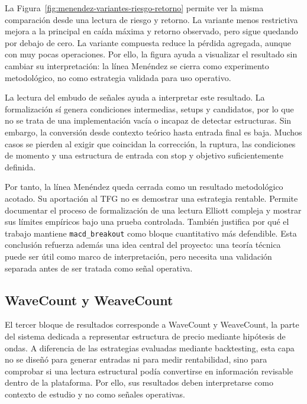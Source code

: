 La Figura~\ref{fig:menendez-variantes-riesgo-retorno} permite ver la misma
comparaci\'on desde una lectura de riesgo y retorno. La variante menos
restrictiva mejora a la principal en ca\'ida m\'axima y retorno observado, pero
sigue quedando por debajo de cero. La variante compuesta reduce la p\'erdida
agregada, aunque con muy pocas operaciones. Por ello, la figura ayuda a
visualizar el resultado sin cambiar su interpretaci\'on: la l\'inea Men\'endez se
cierra como experimento metodol\'ogico, no como estrategia validada para uso
operativo.

La lectura del embudo de se\~nales ayuda a interpretar este resultado. La
formalizaci\'on s\'i genera condiciones intermedias, setups y candidatos, por lo
que no se trata de una implementaci\'on vac\'ia o incapaz de detectar
estructuras. Sin embargo, la conversi\'on desde contexto te\'orico hasta entrada
final es baja. Muchos casos se pierden al exigir que coincidan la correcci\'on,
la ruptura, las condiciones de momento y una estructura de entrada con stop y
objetivo suficientemente definida.

Por tanto, la l\'inea Men\'endez queda cerrada como un resultado metodol\'ogico
acotado. Su aportaci\'on al TFG no es demostrar una estrategia rentable. Permite
documentar el proceso de formalizaci\'on de una lectura Elliott compleja y
mostrar sus l\'imites emp\'iricos bajo una prueba controlada. Tambi\'en justifica
por qu\'e el trabajo mantiene \texttt{macd\_breakout} como bloque cuantitativo m\'as
defendible. Esta conclusi\'on refuerza adem\'as una idea central del proyecto:
una teor\'ia t\'ecnica puede ser \'util como marco de interpretaci\'on, pero
necesita una validaci\'on separada antes de ser tratada como se\~nal operativa.

\subsection{WaveCount y WeaveCount}
\label{subsec:resultados-wavecount-weavecount}

El tercer bloque de resultados corresponde a WaveCount y WeaveCount, la parte
del sistema dedicada a representar estructura de precio mediante hip\'otesis de
ondas. A diferencia de las estrategias evaluadas mediante backtesting, esta capa
no se dise\~n\'o para generar entradas ni para medir rentabilidad, sino para
comprobar si una lectura estructural pod\'ia convertirse en informaci\'on
revisable dentro de la plataforma. Por ello, sus resultados deben interpretarse
como contexto de estudio y no como se\~nales operativas.

